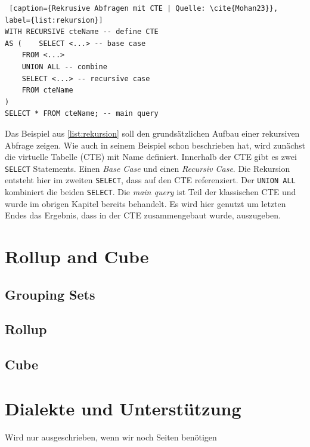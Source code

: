 \begin{lstlisting} [caption={Rekrusive Abfragen mit CTE | Quelle: \cite{Mohan23}}, label={list:rekursion}]
WITH RECURSIVE cteName -- define CTE
AS (	SELECT <...> -- base case
	FROM <...>
	UNION ALL -- combine
	SELECT <...> -- recursive case
	FROM cteName
)
SELECT * FROM cteName; -- main query
\end{lstlisting}

Das Beispiel aus \ref{list:rekursion} soll den grundsätzlichen Aufbau einer rekursiven
Abfrage zeigen. Wie auch \cite{Mohan23} in seinem Beispiel schon beschrieben hat,
wird zunächst die virtuelle Tabelle (CTE) mit Name definiert. Innerhalb der CTE
gibt es zwei \texttt{SELECT} Statements. Einen \textit{Base Case} und einen \textit{Recursiv
Case}. Die Rekursion entsteht hier im zweiten \texttt{SELECT}, dass auf den CTE referenziert.
Der \texttt{UNION ALL} kombiniert die beiden \texttt{SELECT}. Die \textit{main
query} ist Teil der klassischen CTE und wurde im obrigen Kapitel bereits
behandelt. Es wird hier genutzt um letzten Endes das Ergebnis, dass in der CTE
zusammengebaut wurde, auszugeben.


\section{Rollup and Cube}

\subsection{Grouping Sets}

\subsection{Rollup}

\subsection{Cube}


\section{Dialekte und Unterstützung}
Wird nur ausgeschrieben, wenn wir noch Seiten benötigen